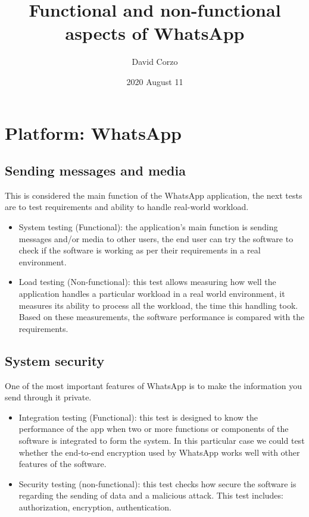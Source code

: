 \documentclass{article}
\title{Functional and non-functional aspects of WhatsApp}
\date{2020 August 11} %
\author{David Corzo}
\begin{document}
\maketitle
\section{Platform: WhatsApp}

\subsection{Sending messages and media}
This is considered the main function of the WhatsApp application, the next tests are to test requirements and ability to handle real-world workload.
\begin{itemize}
    \item System testing (Functional): the application's main function is sending messages and/or media to other users, the end user can try the software to check if the software is working as per their requirements in a real environment.
    \item Load testing (Non-functional): this test allows measuring how well the application handles a particular workload in a real world environment, it measures its ability to process all the workload, the time this handling took. Based on these measurements, the software performance is compared with the requirements. 
\end{itemize}

\subsection{System security}
One of the most important features of WhatsApp is to make the information you send through it private. 
\begin{itemize}
    \item Integration testing (Functional): this test is designed to know the performance of the app when two or more functions or components of the software is integrated to form the system. In this particular case we could test whether the end-to-end encryption used by WhatsApp works well with other features of the software.
    \item Security testing (non-functional): this test checks how secure the software is regarding the sending of data and a malicious attack. This test includes: authorization, encryption, authentication.
\end{itemize}
\end{document}
